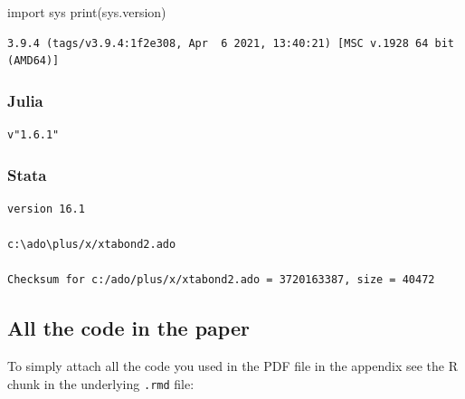 \documentclass[
  12pt,
]{article}
\newenvironment{Shaded}{\begin{snugshade}}{\end{snugshade}}
\newcommand{\BuiltInTok}[1]{#1}
\newcommand{\ImportTok}[1]{#1}
\newcommand{\NormalTok}[1]{#1}
\begin{document}
\begin{Shaded}
\begin{Highlighting}[]
\ImportTok{import}\NormalTok{ sys}
\BuiltInTok{print}\NormalTok{(sys.version)}
\end{Highlighting}
\end{Shaded}

\begin{verbatim}
3.9.4 (tags/v3.9.4:1f2e308, Apr  6 2021, 13:40:21) [MSC v.1928 64 bit (AMD64)]
\end{verbatim}

\hypertarget{julia}{%
\subsubsection{Julia}\label{julia}}

\begin{verbatim}
v"1.6.1"
\end{verbatim}

\hypertarget{stata}{%
\subsubsection{Stata}\label{stata}}

\begin{verbatim}
version 16.1

c:\ado\plus/x/xtabond2.ado

Checksum for c:/ado/plus/x/xtabond2.ado = 3720163387, size = 40472
\end{verbatim}

\hypertarget{all-the-code-in-the-paper}{%
\subsection{All the code in the paper}\label{all-the-code-in-the-paper}}

To simply attach all the code you used in the PDF file in the appendix see the R chunk in the underlying \texttt{.rmd} file:
\end{document}

